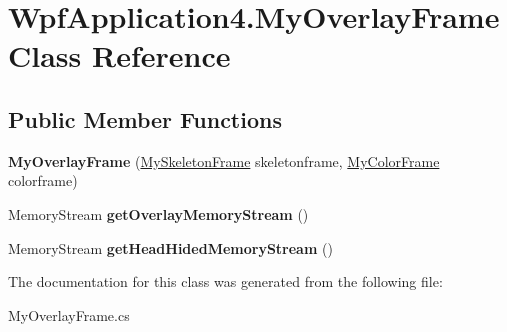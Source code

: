 \hypertarget{class_wpf_application4_1_1_my_overlay_frame}{\section{Wpf\-Application4.\-My\-Overlay\-Frame Class Reference}
\label{class_wpf_application4_1_1_my_overlay_frame}
}
\subsection*{Public Member Functions}
\begin{DoxyCompactItemize}
\item 
\hypertarget{class_wpf_application4_1_1_my_overlay_frame_a7ed1996b644c25a5a8f62dcd1f265dfa}{{\bfseries My\-Overlay\-Frame} (\hyperlink{class_wpf_application4_1_1_my_skeleton_frame}{My\-Skeleton\-Frame} skeletonframe, \hyperlink{class_wpf_application4_1_1_my_color_frame}{My\-Color\-Frame} colorframe)}\label{class_wpf_application4_1_1_my_overlay_frame_a7ed1996b644c25a5a8f62dcd1f265dfa}

\item 
\hypertarget{class_wpf_application4_1_1_my_overlay_frame_ac5a0baf29b301361c92aff3c7446d10d}{Memory\-Stream {\bfseries get\-Overlay\-Memory\-Stream} ()}\label{class_wpf_application4_1_1_my_overlay_frame_ac5a0baf29b301361c92aff3c7446d10d}

\item 
\hypertarget{class_wpf_application4_1_1_my_overlay_frame_a68075afb68faa211dfbe2f839d4e0eeb}{Memory\-Stream {\bfseries get\-Head\-Hided\-Memory\-Stream} ()}\label{class_wpf_application4_1_1_my_overlay_frame_a68075afb68faa211dfbe2f839d4e0eeb}

\end{DoxyCompactItemize}


The documentation for this class was generated from the following file\-:\begin{DoxyCompactItemize}
\item 
My\-Overlay\-Frame.\-cs\end{DoxyCompactItemize}
